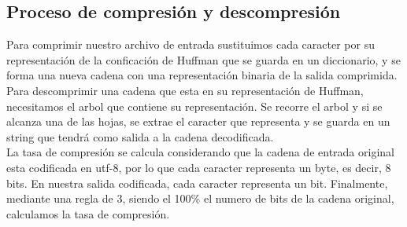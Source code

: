 \subsection*{Proceso de compresión y descompresión}
    
    Para comprimir nuestro archivo de entrada sustituimos cada caracter por su representación de la conficación de Huffman que se guarda en un diccionario, y se forma una nueva cadena con una representación binaria de la salida comprimida. \\
    
    Para descomprimir una cadena que esta en su representación de Huffman, necesitamos el arbol que contiene su representación. Se recorre el arbol y si se alcanza una de las hojas, se extrae el caracter que representa y se guarda en un string que tendrá como salida a la cadena decodificada. \\
    
    La tasa de compresión se calcula considerando que la cadena de entrada original esta codificada en utf-8, por lo que cada caracter representa un byte, es decir, 8 bits. En nuestra salida codificada, cada caracter representa un bit. Finalmente, mediante una regla de 3, siendo el 100\% el numero de bits de la cadena original, calculamos la tasa de compresión.
    
